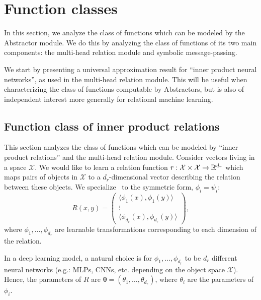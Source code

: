 \def\rdot{\bigcdot}
\def\F{{\mathfrak{F}}}
\def\MLP{\text{MLP}}

\section{Function classes}\label{sec:function_spaces}

In this section, we analyze the class of functions which can be modeled by the Abstractor module. We do this by analyzing the class of functions of its two main components: the multi-head relation module and symbolic message-passing.

We start by presenting a universal approximation result for ``inner product neural networks'', as used in the multi-head relation module. This will be useful when characterizing the class of functions computable by Abstractors, but is also of independent interest more generally for relational machine learning.

\subsection{Function class of inner product relations}

This section analyzes the class of functions which can be modeled by ``inner product relations'' and the multi-head relation module. Consider vectors living in a space \(\mathcal{X}\). We would like to learn a relation function \(r: \mathcal{X} \times \mathcal{X} \to \mathbb{R}^{d_r}\) which maps pairs of objects in \(\mathcal{X}\) to a \(d_r\)-dimensional vector describing the relation between these objects. We specialize~ to the symmetric form, $\phi_i = \psi_i$:
\begin{equation}
	\label{eq:symmetric_inner_product_relations}
	R(x, y) = \begin{pmatrix}\langle \phi_{1}(x), \phi_{1}(y) \rangle \\ \vdots \\ \langle \phi_{d_r}(x), \phi_{d_r}(y) \rangle \end{pmatrix},
\end{equation}
where \(\phi_{1}, \ldots, \phi_{d_r}\) are learnable transformations corresponding to each dimension of the relation.

In a deep learning model, a natural choice is for \(\phi_{1}, \ldots, \phi_{d_r}\) to be \(d_r\) different neural networks (e.g.: MLPs, CNNs, etc. depending on the object space \(\mathcal{X}\)). Hence, the parameters of \(R\) are \(\boldsymbol{\theta} = (\theta_{1}, \ldots, \theta_{d_r})\), where \(\theta_{i}\) are the parameters of \(\phi_{i}\).

